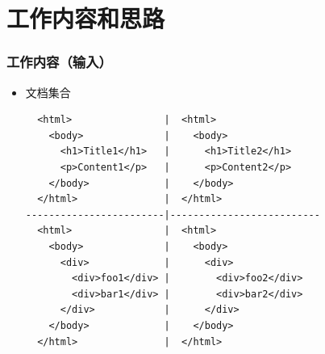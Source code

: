 \documentclass[11pt,presentation]{beamer}
\begin{document}
\section{工作内容和思路}
\label{sec-2}
\begin{frame}[fragile]
\frametitle{工作内容（输入）}
\label{sec-2-1}
\begin{itemize}

\item 文档集合\\
\label{sec-2-1-1}%
\lstset{extendedchars=false,basicstyle=\ttfamily\footnotesize,escapechar=`,breaklines,language=HTML}
\begin{lstlisting}
  <html>                |  <html>                
    <body>              |    <body>              
      <h1>Title1</h1>   |      <h1>Title2</h1>   
      <p>Content1</p>   |      <p>Content2</p>   
    </body>             |    </body>             
  </html>               |  </html>               
------------------------|--------------------------
  <html>                |  <html>                
    <body>              |    <body>              
      <div>             |      <div>             
        <div>foo1</div> |        <div>foo2</div> 
        <div>bar1</div> |        <div>bar2</div> 
      </div>            |      </div>            
    </body>             |    </body>             
  </html>               |  </html>
\end{lstlisting}
\end{itemize} %
\end{frame}
\end{document}
